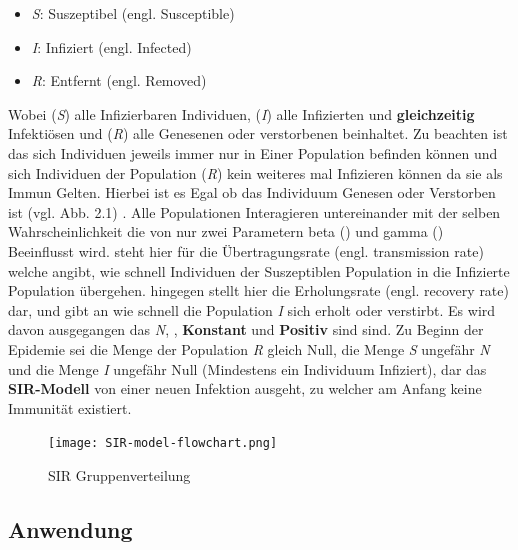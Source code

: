 \documentclass[12pt]{scrartcl} %
\begin{document}
\begin{itemize}
	\item \textit{S}: Suszeptibel (engl. Susceptible)
	\item \textit{I}: Infiziert (engl. Infected)
	\item \textit{R}: Entfernt (engl. Removed)
\end{itemize}
\normalsize

Wobei (\textit{S}) alle Infizierbaren Individuen, (\textit{I}) alle Infizierten und \textbf{gleichzeitig} Infektiösen und (\textit{R}) alle Genesenen oder verstorbenen beinhaltet.  Zu beachten ist das sich Individuen jeweils immer nur in Einer Population befinden können und sich Individuen der Population 
(\textit{R}) kein weiteres mal Infizieren können da sie als Immun Gelten. Hierbei ist es Egal ob das Individuum Genesen oder Verstorben ist (vgl. Abb. 2.1) \cite{4}.
Alle Populationen Interagieren untereinander mit der selben Wahrscheinlichkeit die von nur zwei Parametern beta (\textbeta) und gamma (\textgamma) Beeinflusst wird. 
\textbeta \space steht hier für die Übertragungsrate (engl. transmission rate) welche angibt, wie schnell Individuen der Suszeptiblen Population in die Infizierte Population übergehen. 
\textgamma \space hingegen stellt hier die Erholungsrate (engl. recovery rate) dar, und gibt an wie schnell die Population \textit{I} sich erholt oder verstirbt.
Es wird davon ausgegangen das \textit{N}, \textbeta, \textgamma \space \textbf{Konstant} und \textbf{Positiv} sind sind.
Zu Beginn der Epidemie sei die Menge der Population \textsl{R} gleich Null, die Menge \textsl{S} ungefähr \textit{N} und die Menge \textit{I} ungefähr Null (Mindestens ein Individuum Infiziert), dar das \textbf{SIR-Modell} von einer neuen Infektion ausgeht, zu welcher am Anfang keine Immunität existiert.

	\begin{figure}[h]
	\centering
	\texttt{[image: SIR-model-flowchart.png]} 
	\caption[SIR Gruppenverteilung,\newline https://www.researchgate.net/figure/SIR-model-flowchart\textunderscore fig8]{SIR Gruppenverteilung}
	\end{figure}


\subsection{Anwendung}
\end{document}
